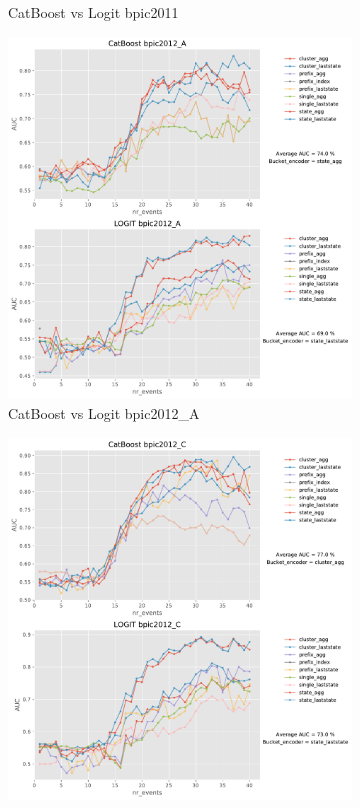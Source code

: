 \documentclass[twoside,11pt]{Latex/Classes/PhDthesisPSnPDF}
\begin{document}
\begin{figure}[t!]
\begin{subfigure}{0.48\textwidth}
		\caption{CatBoost vs Logit bpic2011} \label{fig:b11cl}
	\end{subfigure}
	
	\medskip
	\begin{subfigure}{0.48\textwidth}
		\includegraphics[width=\linewidth]{images/catboost/graphslogit/bpic2012_A_CatBoost_logit.pdf}
		\caption{CatBoost vs Logit bpic2012\_A} \label{fig:b12acl}
	\end{subfigure}\hspace*{\fill}
	\begin{subfigure}{0.48\textwidth}
		\includegraphics[width=\linewidth]{images/catboost/graphslogit/bpic2012_C_CatBoost_logit.pdf}

\end{subfigure}
\end{figure}
\end{document}
